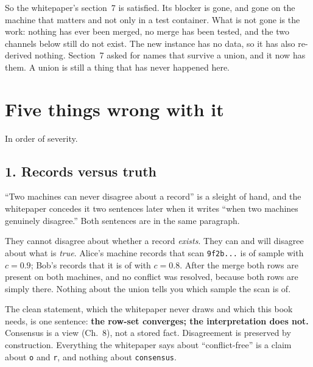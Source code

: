 So the whitepaper's section~7 is satisfied. Its blocker is gone, and gone on the machine that matters and not only in a test container. What is not gone is the work: nothing has ever been merged, no merge has been tested, and the two channels below still do not exist. The new instance has no data, so it has also re-derived nothing. Section~7 asked for names that survive a union, and it now has them. A union is still a thing that has never happened here.

\section{Five things wrong with it}

In order of severity.

\subsection{1. Records versus truth}

``Two machines can never disagree about a record'' is a sleight of hand, and the whitepaper concedes it two sentences later when it writes ``when two machines genuinely disagree.'' Both sentences are in the same paragraph.

They cannot disagree about whether a record \emph{exists}. They can and will disagree about what is \emph{true}. Alice's machine records that scan \texttt{9f2b...} is of sample \labSample with $c = 0.9$; Bob's records that it is of \labSampleAlt with $c = 0.8$. After the merge both rows are present on both machines, and no conflict was resolved, because both rows are simply there. Nothing about the union tells you which sample the scan is of.

The clean statement, which the whitepaper never draws and which this book needs, is one sentence: \textbf{the row-set converges; the interpretation does not.} Consensus is a view (Ch.~8), not a stored fact. Disagreement is preserved by construction. Everything the whitepaper says about ``conflict-free'' is a claim about \texttt{o} and \texttt{r}, and nothing about \texttt{consensus}.

